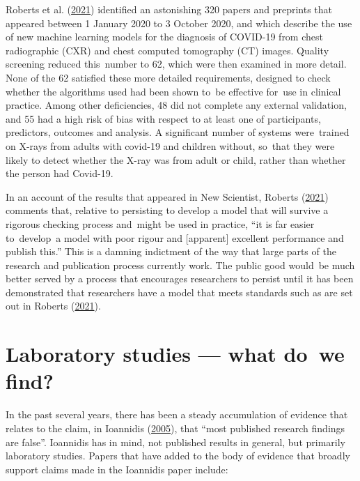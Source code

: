 \documentclass[
  10ptls,
  b5paper]{book}
\begin{document}
Roberts et al. (\protect\hyperlink{ref-roberts2021common}{2021}) identified an astonishing 320 papers and preprints
that appeared between 1 January 2020 to 3 October 2020, and which
describe the use of new machine learning models for the diagnosis of
COVID-19 from chest radiographic (CXR) and chest computed tomography
(CT) images. Quality screening reduced this~number to 62, which were
then examined in more detail. None of the 62 satisfied these more
detailed requirements, designed to check whether the algorithms used
had been shown to~be effective for~use in clinical practice. Among
other deficiencies, 48 did not complete any external validation, and
55 had a high risk of bias with respect to at least one of
participants, predictors, outcomes and analysis. A significant number
of systems were~trained on X-rays from adults with covid-19 and
children without, so~that they were likely to detect whether the
X-ray was from adult or child, rather than whether the person had
Covid-19.

In an account of the results that appeared in New Scientist,
Roberts (\protect\hyperlink{ref-roberts2021AIcovid19}{2021}) comments that, relative to persisting to
develop a model that will survive a rigorous
checking process and~might be used in practice, ``it is far easier
to~develop~a model with poor rigour and {[}apparent{]} excellent
performance and publish this.'' This is a damning indictment of
the way that large parts of the research and publication process
currently work. The public good would~be much better served
by a process that encourages researchers to persist until it
has been demonstrated that researchers have a model that meets
standards such as are set out in Roberts (\protect\hyperlink{ref-roberts2021common}{2021}).

\hypertarget{sec:lab}{%
\section{Laboratory studies --- what do~we find?}\label{sec:lab}}

In the past several years, there has been a steady accumulation
of evidence that relates to the claim, in Ioannidis (\protect\hyperlink{ref-r19_ioannidis_2005}{2005}),
that ``most published research findings are false''. Ioannidis
has in mind, not published results in general, but primarily
laboratory studies. Papers that have added to the
body of evidence that broadly support claims made in the
Ioannidis paper include:
\end{document}
